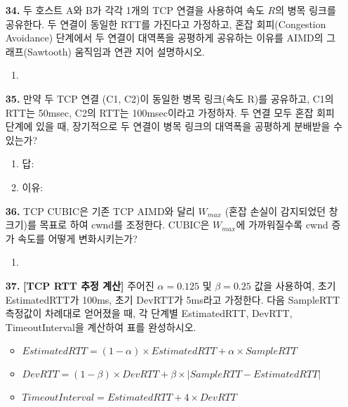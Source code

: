 \documentclass[a4paper, 10pt]{article}
\newcommand{\ansline}[1]{\underline{\hspace{#1}}}
\newcommand{\sectionbox}[1]{
  \vspace{0.5em}
  \noindent\fbox{\textbf{#1}}
  \vspace{0.5em}
}
\begin{document}
\begin{enumerate}[itemsep=2em, leftmargin=2em, label={}]
\item[\textbf{34.}] 두 호스트 A와 B가 각각 1개의 TCP 연결을 사용하여 속도 $R$의 병목 링크를 공유한다. 두 연결이 동일한 RTT를 가진다고 가정하고, 혼잡 회피(Congestion Avoidance) 단계에서 두 연결이 대역폭을 공평하게 공유하는 이유를 AIMD의 그래프(Sawtooth) 움직임과 연관 지어 설명하시오.
\begin{enumerate}[label={}, itemsep=0.3em, leftmargin=1.5em]
    \item \ansline{12cm}
\end{enumerate}

\item[\textbf{35.}] 만약 두 TCP 연결 (C1, C2)이 동일한 병목 링크(속도 R)를 공유하고, C1의 RTT는 50msec, C2의 RTT는 100msec이라고 가정하자. 두 연결 모두 혼잡 회피 단계에 있을 때, 장기적으로 두 연결이 병목 링크의 대역폭을 공평하게 분배받을 수 있는가?
\begin{enumerate}[label=\alph*., itemsep=0.3em, leftmargin=1.5em]
    \item 답: \ansline{2cm}
    \item 이유: \ansline{10cm}
\end{enumerate}

\item[\textbf{36.}] TCP CUBIC은 기존 TCP AIMD와 달리 $W_{max}$ (혼잡 손실이 감지되었던 창 크기)를 목표로 하여 cwnd를 조정한다. CUBIC은 $W_{max}$에 가까워질수록 cwnd 증가 속도를 어떻게 변화시키는가?
\begin{enumerate}[label={}, itemsep=0.3em, leftmargin=1.5em]
    \item \ansline{12cm}
\end{enumerate}


\item[] \sectionbox{VI. 계산 및 분석 문제 (2문제)}

\item[\textbf{37.}] \textbf{[TCP RTT 추정 계산]} 주어진 $\alpha = 0.125$ 및 $\beta = 0.25$ 값을 사용하여, 초기 EstimatedRTT가 100ms, 초기 DevRTT가 5ms라고 가정한다. 다음 SampleRTT 측정값이 차례대로 얻어졌을 때, 각 단계별 EstimatedRTT, DevRTT, TimeoutInterval을 계산하여 표를 완성하시오.
\begin{itemize}[leftmargin=1.5em]
    \item $EstimatedRTT = (1-\alpha) \times EstimatedRTT + \alpha \times SampleRTT$
    \item $DevRTT = (1-\beta) \times DevRTT + \beta \times |SampleRTT - EstimatedRTT|$
    \item $TimeoutInterval = EstimatedRTT + 4 \times DevRTT$
\end{itemize}


\end{enumerate}
\end{document}
